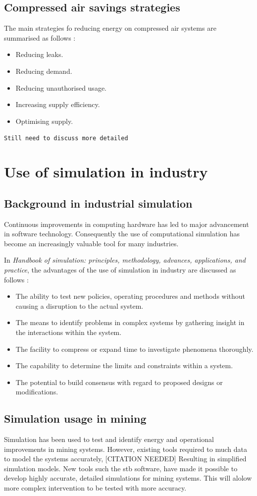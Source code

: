 	\subsection{Compressed air savings strategies}
		The main strategies fo reducing energy on compressed air systems are summarised as follows \cite{Snyman2011Masters}:
		\begin{itemize}
			\item Reducing leaks.
			\item Reducing demand.
			\item Reducing unauthorised usage.
			\item Increasing supply efficiency.
			\item Optimising supply.
		\end{itemize}
	\texttt{Still need to discuss more detailed}
	\section{Use of simulation in industry }
	\subsection{Background in industrial simulation}
		Continuous improvements in computing hardware has led to major advancement in software technology. Consequently the use of computational simulation has become an increasingly valuable tool for many industries.\cite{kocsis2003integration} \par 
		In \textit{ Handbook of simulation: principles, methodology, advances, applications, and practice}, the advantages of the use of simulation in industry are discussed as follows \cite{banks1998handbook}: 
		\begin{itemize}
			\item The ability to test new policies, operating procedures and methods without causing a disruption to the actual system.
			\item The means to identify problems in complex systems by gathering insight in the interactions within the system.
			\item The facility to compress or expand time to investigate phenomena thoroughly.
			\item The capability to determine the limits and constraints within a system.
			\item The potential to build consensus with regard to proposed designs or modifications.
		\end{itemize}
	\subsection{Simulation usage in mining}
		Simulation has been used to test and identify energy and operational improvements in mining systems. However,  existing tools required to much data to model the systems accurately, [CITATION NEEDED] Resulting in simplified simulation models.  New tools such the \gls{stb} software, have made it possible to develop highly accurate, detailed simulations for mining systems. This will alolow more complex intervention to be tested with more accuracy.
		
